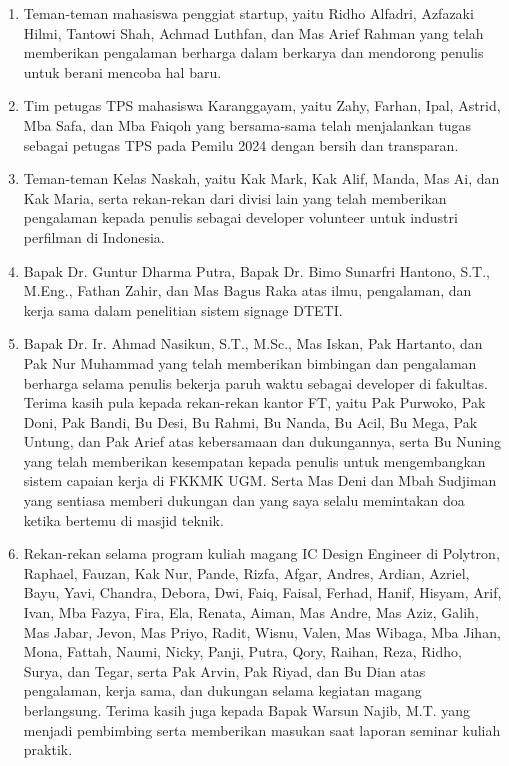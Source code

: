 \begin{enumerate}
	\item Teman-teman mahasiswa penggiat startup, yaitu Ridho Alfadri, Azfazaki
	Hilmi, Tantowi Shah, Achmad Luthfan, dan Mas Arief Rahman yang telah
	memberikan pengalaman berharga dalam berkarya dan mendorong penulis untuk
	berani mencoba hal baru.

	\item Tim petugas TPS mahasiswa Karanggayam, yaitu Zahy, Farhan, Ipal,
	Astrid, Mba Safa, dan Mba Faiqoh yang bersama-sama telah menjalankan tugas
	sebagai petugas TPS pada Pemilu 2024 dengan bersih dan transparan.

	\item Teman-teman Kelas Naskah, yaitu Kak Mark, Kak Alif, Manda, Mas Ai,
	dan Kak Maria, serta rekan-rekan dari divisi lain yang telah memberikan
	pengalaman kepada penulis sebagai developer volunteer untuk industri
	perfilman di Indonesia.

	\item Bapak Dr. Guntur Dharma Putra, Bapak Dr. Bimo Sunarfri Hantono,
	S.T., M.Eng., Fathan Zahir, dan Mas Bagus Raka atas ilmu, pengalaman, dan
	kerja sama dalam penelitian sistem signage DTETI.
	
	\item Bapak Dr. Ir. Ahmad Nasikun, S.T., M.Sc., Mas Iskan, Pak Hartanto,
	dan Pak Nur Muhammad yang telah memberikan bimbingan dan pengalaman
	berharga selama penulis bekerja paruh waktu sebagai developer di fakultas.
	Terima kasih pula kepada rekan-rekan kantor FT, yaitu Pak Purwoko, Pak
	Doni, Pak Bandi, Bu Desi, Bu Rahmi, Bu Nanda, Bu Acil, Bu Mega, Pak
	Untung, dan Pak Arief atas kebersamaan dan dukungannya, serta Bu Nuning
	yang telah memberikan kesempatan kepada penulis untuk mengembangkan sistem
	capaian kerja di FKKMK UGM. Serta Mas Deni dan Mbah Sudjiman yang sentiasa memberi dukungan dan yang saya selalu memintakan doa ketika bertemu di masjid teknik.
	
	\item Rekan-rekan selama program kuliah magang IC Design Engineer di Polytron,
	Raphael, Fauzan, Kak Nur, Pande, Rizfa, Afgar, Andres, Ardian, Azriel, Bayu,
	Yavi, Chandra, Debora, Dwi, Faiq, Faisal, Ferhad, Hanif, Hisyam, Arif, Ivan,
	Mba Fazya, Fira, Ela, Renata, Aiman, Mas Andre, Mas Aziz, Galih, Mas Jabar,
	Jevon, Mas Priyo, Radit, Wisnu, Valen, Mas Wibaga, Mba Jihan, Mona, Fattah,
	Naumi, Nicky, Panji, Putra, Qory, Raihan, Reza, Ridho, Surya, dan Tegar,
	serta Pak Arvin, Pak Riyad, dan Bu Dian atas pengalaman, kerja sama, dan
	dukungan selama kegiatan magang berlangsung. Terima kasih juga kepada Bapak
	Warsun Najib, M.T. yang menjadi pembimbing serta memberikan masukan saat
	laporan seminar kuliah praktik.
	

\end{enumerate}

